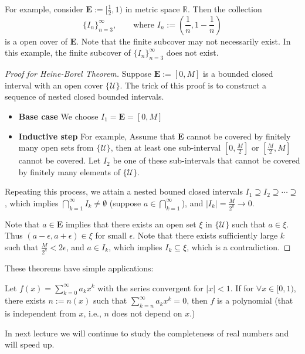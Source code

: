For example, consider $\bm E:=[\frac{1}{2},1)$ in metric space $\mathbb{R}$. Then the collection
\[
\{I_n\}_{n=3}^\infty,\qquad
\mbox{where }I_n:=(\frac{1}{n},1-\frac{1}{n})
\]
is a open cover of $\bm E$. Note that the finite subcover may not necessarily exist. In this example, the finite subcover of $\{I_n\}_{n=3}^\infty$ does not exist.
\begin{proof}[Proof for Heine-Borel Theorem]\quad

Suppose $\bm E:=[0,M]$ is a bounded closed interval with an open cover $\{\mathcal{U}\}.$ The trick of this proof is to construct a sequence of nested closed bounded intervals. 
\begin{itemize}
\item\textbf{Base case }
We choose $I_1 =\bm E=[0,M]$
\item\textbf{Inductive step}
For example, Assume that $\bm E$ cannot be covered by finitely many open sets from $\{\mathcal{U}\}$, then at least one sub-interval $[0,\frac{M}{2}]$ or $[\frac{M}{2},M]$ cannot be covered. Let $I_2$ be one of these sub-intervals that cannot be covered by finitely many elements of $\{\mathcal{U}\}$.
\end{itemize}

Repeating this process, we attain a nested bouned closed intervals $I_1\supseteq I_2\supseteq\cdots\supseteq$, which implies $\bigcap_{k=1}^\infty I_k \ne\emptyset$ (suppose $a\in \bigcap_{k=1}^\infty$), and $|I_k|=\frac{M}{2^k}\to0$.

Note that $a\in\bm E$ implies that there exists an open set $\xi$ in $\{\mathcal{U}\}$ such that $a\in\xi$. Thus $(a-\epsilon,a+\epsilon)\in\xi$ for small $\epsilon$. Note that there exists sufficiently large $k$ such that $\frac{M}{2^k}<2\epsilon$, and $a\in I_k$, which implies $I_k\subseteq\xi$, which is a contradiction.
\end{proof}




These theorems have simple applications:
\begin{proposition}
Let $f(x) = \sum_{k=0}^\infty a_kx^k$ with the series convergent for $|x|<1$. If for $\forall x\in[0,1)$, there exists $n:=n(x)$ such that $\sum_{k=n}^\infty a_kx^k=0$, then $f$ is a polynomial (that is independent from $x$, i.e., $n$ does not depend on $x$.)
\end{proposition}
In next lecture we will continue to study the completeness of real numbers and will speed up.






















